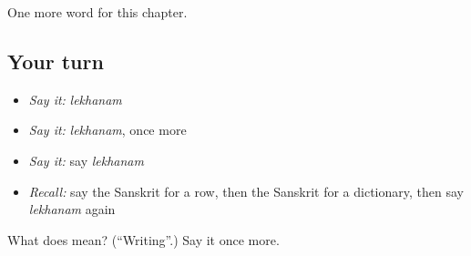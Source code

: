 \begin{grammarlens}[title={What you've built}]
One more word for this chapter.
\end{grammarlens}

\subsection*{Your turn}
\begin{itemize}
\raggedright
  \item \emph{Say it:} \emph{lekhanam}
  \item \emph{Say it:} \emph{lekhanam}, once more
  \item \emph{Say it:} say \emph{lekhanam}
  \item \emph{Recall:} say the Sanskrit for a row, then the Sanskrit for a dictionary, then say \emph{lekhanam} again
\end{itemize}

\begin{tcolorbox}[breakable,colback=teal!4,colframe=teal!35!black,title={Before you move on}]
What does  mean? (\textquotedblleft{}Writing\textquotedblright{}.) Say it once more.
\end{tcolorbox}
